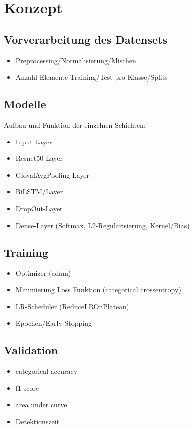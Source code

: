 \documentclass{article}
\begin{document}
    \newpage
    \section{Konzept}
    \subsection{Vorverarbeitung des Datensets}
    \begin{itemize}
        \item Preprocessing/Normalisierung/Mischen
        \item Anzahl Elemente Training/Test pro Klasse/Splits
    \end{itemize}
    \subsection{Modelle}
    Aufbau und Funktion der einzelnen Schichten:
    \begin{itemize}
        \item Input-Layer
        \item Resnet50-Layer
        \item GlovalAvgPooling-Layer
        \item BiLSTM/Layer
        \item DropOut-Layer
        \item Dense-Layer (Softmax, L2-Regularisierung, Kernel/Bias)
    \end{itemize}
    \subsection{Training}
    \begin{itemize}
        \item Optimizer (adam)
        \item Minimierung Loss Funktion (categorical crossentropy)
        \item LR-Scheduler (ReduceLROnPlateau)
        \item Epochen/Early-Stopping
    \end{itemize}
    \subsection{Validation}
    \begin{itemize}
        \item categorical accuracy
        \item f1 score
        \item area under curve
        \item Detektionszeit
    \end{itemize}
\end{document}
